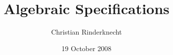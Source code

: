 \documentclass[compress,dvips,xcolor={dvipsnames},t]{beamer}
\title{Algebraic Specifications}
\author{Christian Rinderknecht}
\date{19 October 2008}
\begin{document}
\frame{\maketitle}







\end{document}
